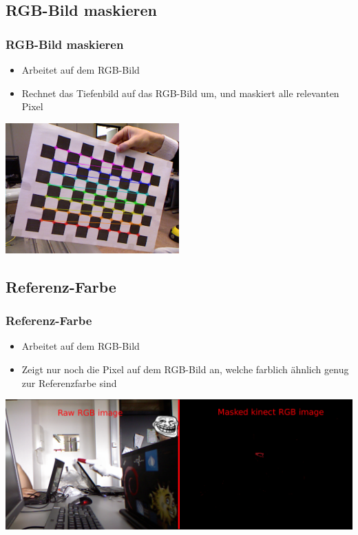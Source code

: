 \documentclass[compress]{beamer}
\begin{document}
\subsection{RGB-Bild maskieren}
\begin{frame}
\frametitle{RGB-Bild maskieren}
\begin{itemize}
	\item Arbeitet auf dem RGB-Bild
	\item Rechnet das Tiefenbild auf das RGB-Bild um, und maskiert alle relevanten Pixel
\end{itemize}

\includegraphics[width=0.5\textwidth]{trans.png}
\end{frame}

\subsection{Referenz-Farbe}
\begin{frame}
\frametitle{Referenz-Farbe}
\begin{itemize}
	\item Arbeitet auf dem RGB-Bild
	\item Zeigt nur noch die Pixel auf dem RGB-Bild an, welche farblich ähnlich genug zur Referenzfarbe sind
\end{itemize}

\includegraphics[width=\textwidth]{filter4.png}
\end{frame}
\end{document}
